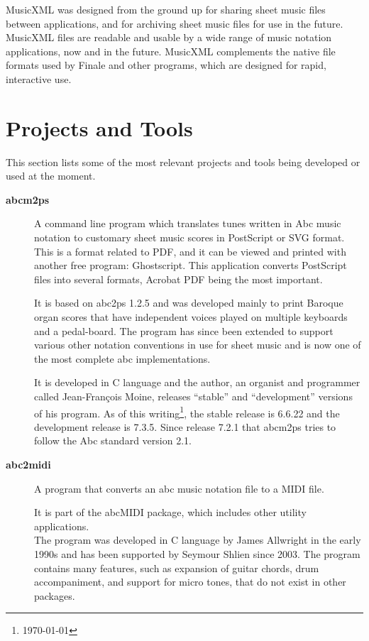 \documentclass[main.tex]{files}
\begin{document}
MusicXML was designed from the ground up for sharing sheet music files between applications, and
for archiving sheet music files for use in the future. MusicXML files are readable and usable by a
wide range of music notation applications, now and in the future. MusicXML complements the native
file formats used by Finale and other programs, which are designed for rapid, interactive use.

\section{Projects and Tools} 

This section lists some of the most relevant projects and tools being developed or used at the
moment.

\begin{description}
  \item[\textbf{abcm2ps}]\cite{abcm2ps:Online}
    A command line program which translates tunes written in Abc music notation to customary
    sheet music scores in PostScript or SVG format.
    This is a format related to PDF, and it can be viewed and printed with another free program:
    Ghostscript. This application converts PostScript files into several formats, Acrobat PDF
    being the most important.

    It is based on abc2ps 1.2.5 and was developed mainly to print Baroque organ scores that
    have independent voices played on multiple keyboards and a pedal-board. The  program  has
    since been extended to support various other notation conventions in use for sheet music
    and is now one of the most complete abc implementations.

    It is developed in C language and the author, an organist and programmer called Jean-François
    Moine, releases “stable” and “development” versions of his program. As of this
    writing\footnote{\today}, the stable release is 6.6.22 and the development release is
    7.3.5. Since release 7.2.1 that abcm2ps tries to follow the Abc standard version 2.1.

  \item[\textbf{abc2midi}]\cite{abc2midi:Online}
    A program that converts an abc music notation file to a MIDI file.
    
    It is part of the abcMIDI package, which includes other utility applications.\\ The program
    was developed in C language by James Allwright in the early 1990s and has been supported by
    Seymour Shlien since 2003. The program contains many features, such as expansion of guitar
    chords, drum accompaniment, and support for micro tones, that do not exist in other packages.


\end{description}
\end{document}

